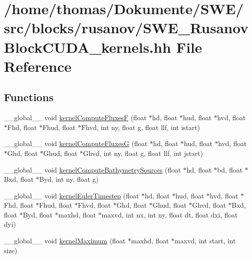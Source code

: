 \hypertarget{SWE__RusanovBlockCUDA__kernels_8hh}{\section{/home/thomas/\-Dokumente/\-S\-W\-E/src/blocks/rusanov/\-S\-W\-E\-\_\-\-Rusanov\-Block\-C\-U\-D\-A\-\_\-kernels.hh File Reference}
\label{SWE__RusanovBlockCUDA__kernels_8hh}
}
\subsection*{Functions}
\begin{DoxyCompactItemize}
\item 
\-\_\-\-\_\-global\-\_\-\-\_\- void \hyperlink{SWE__RusanovBlockCUDA__kernels_8hh_a125f373796424316bc49a0eb60f5f90e}{kernel\-Compute\-Fluxes\-F} (float $\ast$hd, float $\ast$hud, float $\ast$hvd, float $\ast$Fhd, float $\ast$Fhud, float $\ast$Fhvd, int ny, float g, float llf, int istart)
\item 
\-\_\-\-\_\-global\-\_\-\-\_\- void \hyperlink{SWE__RusanovBlockCUDA__kernels_8hh_a4a5d67e82c837347e337904d4c17cc07}{kernel\-Compute\-Fluxes\-G} (float $\ast$hd, float $\ast$hud, float $\ast$hvd, float $\ast$Ghd, float $\ast$Ghud, float $\ast$Ghvd, int ny, float g, float llf, int jstart)
\item 
\-\_\-\-\_\-global\-\_\-\-\_\- void \hyperlink{SWE__RusanovBlockCUDA__kernels_8hh_aa7530530448af30119436099351cfead}{kernel\-Compute\-Bathymetry\-Sources} (float $\ast$hd, float $\ast$bd, float $\ast$Bxd, float $\ast$Byd, int ny, float g)
\item 
\-\_\-\-\_\-global\-\_\-\-\_\- void \hyperlink{SWE__RusanovBlockCUDA__kernels_8hh_a105ff13519fe40ec2acbc182d5584a07}{kernel\-Euler\-Timestep} (float $\ast$hd, float $\ast$hud, float $\ast$hvd, float $\ast$Fhd, float $\ast$Fhud, float $\ast$Fhvd, float $\ast$Ghd, float $\ast$Ghud, float $\ast$Ghvd, float $\ast$Bxd, float $\ast$Byd, float $\ast$maxhd, float $\ast$maxvd, int nx, int ny, float dt, float dxi, float dyi)
\item 
\-\_\-\-\_\-global\-\_\-\-\_\- void \hyperlink{SWE__RusanovBlockCUDA__kernels_8hh_ae810017f0a27a38e1c5d78c7130e8ab4}{kernel\-Maximum} (float $\ast$maxhd, float $\ast$maxvd, int start, int size)
\end{DoxyCompactItemize}


